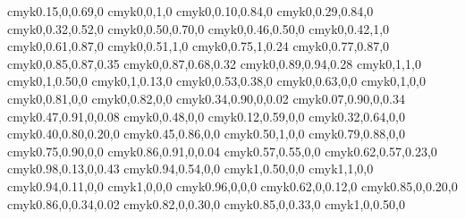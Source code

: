 \definecolor{GreenYellow}   {cmyk}{0.15,0,0.69,0}
	\definecolor{Yellow}        {cmyk}{0,0,1,0}
	\definecolor{Goldenrod}     {cmyk}{0,0.10,0.84,0}
	\definecolor{Dandelion}     {cmyk}{0,0.29,0.84,0}
	\definecolor{Apricot}       {cmyk}{0,0.32,0.52,0}
	\definecolor{Peach}         {cmyk}{0,0.50,0.70,0}
	\definecolor{Melon}         {cmyk}{0,0.46,0.50,0}
	\definecolor{YellowOrange}  {cmyk}{0,0.42,1,0}
	\definecolor{Orange}        {cmyk}{0,0.61,0.87,0}
	\definecolor{BurntOrange}   {cmyk}{0,0.51,1,0}
	\definecolor{Bittersweet}   {cmyk}{0,0.75,1,0.24}
	\definecolor{RedOrange}     {cmyk}{0,0.77,0.87,0}
	\definecolor{Mahogany}      {cmyk}{0,0.85,0.87,0.35}
	\definecolor{Maroon}        {cmyk}{0,0.87,0.68,0.32}
	\definecolor{BrickRed}      {cmyk}{0,0.89,0.94,0.28}
	\definecolor{Red}           {cmyk}{0,1,1,0}
	\definecolor{OrangeRed}     {cmyk}{0,1,0.50,0}
	\definecolor{RubineRed}     {cmyk}{0,1,0.13,0}
	\definecolor{Salmon}        {cmyk}{0,0.53,0.38,0}
	\definecolor{CarnationPink} {cmyk}{0,0.63,0,0}
	\definecolor{Magenta}       {cmyk}{0,1,0,0}
	\definecolor{VioletRed}     {cmyk}{0,0.81,0,0}
	\definecolor{Rhodamine}     {cmyk}{0,0.82,0,0}
	\definecolor{Mulberry}      {cmyk}{0.34,0.90,0,0.02}
	\definecolor{RedViolet}     {cmyk}{0.07,0.90,0,0.34}
	\definecolor{Fuchsia}       {cmyk}{0.47,0.91,0,0.08}
	\definecolor{Lavender}      {cmyk}{0,0.48,0,0}
	\definecolor{Thistle}       {cmyk}{0.12,0.59,0,0}
	\definecolor{Orchid}        {cmyk}{0.32,0.64,0,0}
	\definecolor{DarkOrchid}    {cmyk}{0.40,0.80,0.20,0}
	\definecolor{Purple}        {cmyk}{0.45,0.86,0,0}
	\definecolor{Plum}          {cmyk}{0.50,1,0,0}
	\definecolor{Violet}        {cmyk}{0.79,0.88,0,0}
	\definecolor{RoyalPurple}   {cmyk}{0.75,0.90,0,0}
	\definecolor{BlueViolet}    {cmyk}{0.86,0.91,0,0.04}
	\definecolor{Periwinkle}    {cmyk}{0.57,0.55,0,0}
	\definecolor{CadetBlue}     {cmyk}{0.62,0.57,0.23,0}
	\definecolor{MidnightBlue}  {cmyk}{0.98,0.13,0,0.43}
	\definecolor{NavyBlue}      {cmyk}{0.94,0.54,0,0}
	\definecolor{RoyalBlue}     {cmyk}{1,0.50,0,0}
	\definecolor{Blue}          {cmyk}{1,1,0,0}
	\definecolor{Cerulean}      {cmyk}{0.94,0.11,0,0}
	\definecolor{Cyan}          {cmyk}{1,0,0,0}
	\definecolor{ProcessBlue}   {cmyk}{0.96,0,0,0}
	\definecolor{SkyBlue}       {cmyk}{0.62,0,0.12,0}
	\definecolor{Turquoise}     {cmyk}{0.85,0,0.20,0}
	\definecolor{TealBlue}      {cmyk}{0.86,0,0.34,0.02}
	\definecolor{Aquamarine}    {cmyk}{0.82,0,0.30,0}
	\definecolor{BlueGreen}     {cmyk}{0.85,0,0.33,0}
	\definecolor{Emerald}       {cmyk}{1,0,0.50,0}
